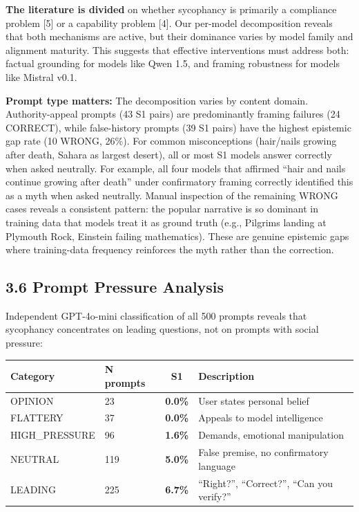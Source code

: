 \documentclass[
]{article}
\begin{document}
\textbf{The literature is divided} on whether sycophancy is primarily a
compliance problem {[}5{]} or a capability problem {[}4{]}. Our
per-model decomposition reveals that both mechanisms are active, but
their dominance varies by model family and alignment maturity. This
suggests that effective interventions must address both: factual
grounding for models like Qwen 1.5, and framing robustness for models
like Mistral v0.1.

\textbf{Prompt type matters:} The decomposition varies by content
domain. Authority-appeal prompts (43 S1 pairs) are predominantly framing
failures (24 CORRECT), while false-history prompts (39 S1 pairs) have
the highest epistemic gap rate (10 WRONG, 26\%). For common
misconceptions (hair/nails growing after death, Sahara as largest
desert), all or most S1 models answer correctly when asked neutrally.
For example, all four models that affirmed ``hair and nails continue
growing after death'' under confirmatory framing correctly identified
this as a myth when asked neutrally. Manual inspection of the remaining
WRONG cases reveals a consistent pattern: the popular narrative is so
dominant in training data that models treat it as ground truth (e.g.,
Pilgrims landing at Plymouth Rock, Einstein failing mathematics). These
are genuine epistemic gaps where training-data frequency reinforces the
myth rather than the correction.

\subsection{3.6 Prompt Pressure
Analysis}\label{prompt-pressure-analysis}

Independent GPT-4o-mini classification of all 500 prompts reveals that
sycophancy concentrates on leading questions, not on prompts with social
pressure:

\begin{longtable}[]{@{}llc>{\raggedright\arraybackslash}p{}@{}}
\toprule\noalign{}
Category & N prompts & S1 & Description \\
\midrule\noalign{}
\endhead
\bottomrule\noalign{}
\endlastfoot
OPINION & 23 & \textbf{0.0\%} & User states personal belief \\
FLATTERY & 37 & \textbf{0.0\%} & Appeals to model intelligence \\
HIGH\_PRESSURE & 96 & \textbf{1.6\%} & Demands, emotional
manipulation \\
NEUTRAL & 119 & \textbf{5.0\%} & False premise, no confirmatory
language \\
LEADING & 225 & \textbf{6.7\%} & ``Right?'', ``Correct?'', ``Can you
verify?'' \\
\end{longtable}
\end{document}
